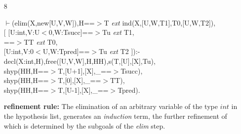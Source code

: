 \documentclass[11pt]{report}
\begin{document}
 \begin{enumerate}
 \item[8]
\begin{sf}\begin{tabbing}
$\vdash$(elim(X,new[U,V,W]),H==$>$T \mbox{\it ext} ind(X,[U,W,T1],T0,[U,W,T2]),\\[-0.15ex]
\hspace{2em}[ [U:int,V:U$<$0,W:Tsucc]==$>$Tu \mbox{\it ext} T1, \\[-0.15ex]
\hspace{3em}==$>$TT \mbox{\it ext} T0, \\[-0.15ex]
\hspace{3em}[U:int,V:0$<$U,W:Tpred]==$>$Tu \mbox{\it ext} T2 ]):-\\[-0.15ex]
\hspace{2em}decl(X:int,H),free([U,V,W],H,HH),s(T,[U],[X],Tu),\\[-0.15ex]
\hspace{2em}shyp(HH,H==$>$T,[U+1],[X],\_\hspace{0.1em}==$>$Tsucc),\\[-0.15ex]
\hspace{2em}shyp(HH,H==$>$T,[0],[X],\_\hspace{0.1em}==$>$TT),\\[-0.15ex]
\hspace{2em}shyp(HH,H==$>$T,[U-1],[X],\_\hspace{0.1em}==$>$Tpred).
\end{tabbing}\end{sf}

 {\bf refinement rule:}
 The elimination of an arbitrary variable of the type $int$ in
 the hypothesis list, generates an \emph{induction} term, the 
 further refinement of which is determined by the subgoals
 of the \emph{elim} step.
  

\end{enumerate}
\end{document}
